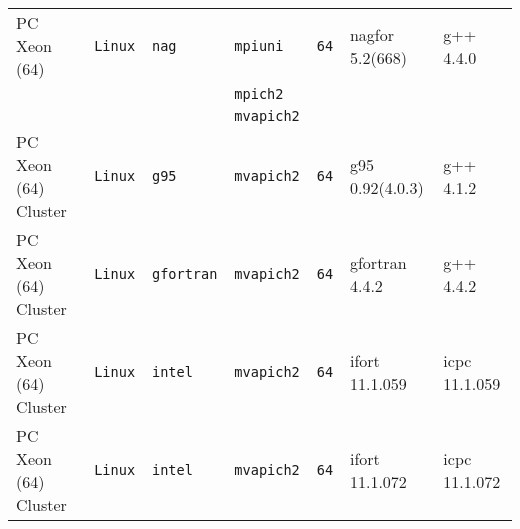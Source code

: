 \begin{tabular}{lllllll}
PC Xeon (64)          &\tt Linux  &\tt nag          &\tt mpiuni     &\tt 64              & nagfor \footnotesize 5.2(668)      & g++  \footnotesize 4.4.0        \\ %
                      &           &                 &\tt mpich2     &                    &                                    &                                 \\
                      &           &                 &\tt mvapich2   &                    &                                    &                                 \\
PC Xeon (64) Cluster  &\tt Linux  &\tt g95          &\tt mvapich2   &\tt 64              & g95 \footnotesize 0.92(4.0.3)      & g++ \footnotesize 4.1.2         \\ %
PC Xeon (64) Cluster  &\tt Linux  &\tt gfortran     &\tt mvapich2   &\tt 64              & gfortran \footnotesize 4.4.2       & g++ \footnotesize 4.4.2         \\ %
PC Xeon (64) Cluster  &\tt Linux  &\tt intel        &\tt mvapich2   &\tt 64              & ifort \footnotesize 11.1.059       & icpc \footnotesize 11.1.059     \\ %
PC Xeon (64) Cluster  &\tt Linux  &\tt intel        &\tt mvapich2   &\tt 64              & ifort \footnotesize 11.1.072       & icpc \footnotesize 11.1.072     \\ %

\end{tabular}
